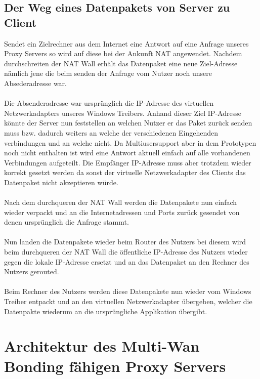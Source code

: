 \subsection{Der Weg eines Datenpakets von Server zu Client}
Sendet ein Zielrechner aus dem Internet eine Antwort auf eine Anfrage unseres Proxy Servers so wird auf diese bei der Ankunft NAT angewendet. Nachdem durchschreiten der NAT Wall erhält das Datenpaket eine neue Ziel-Adresse nämlich jene die beim senden der Anfrage vom Nutzer noch unsere Absederadresse war.
\\\\
Die Absenderadresse war ursprünglich die IP-Adresse des virtuellen Netzwerkadapters unseres Windows Treibers. Anhand dieser Ziel IP-Adresse könnte der Server nun feststellen an welchen Nutzer er das Paket zurück senden muss bzw. dadurch weiters an welche der verschiedenen Eingehenden verbindungen und an welche nicht. Da Multiusersupport aber in dem Prototypen noch nicht enthalten ist wird eine Antwort aktuell einfach auf alle vorhandenen Verbindungen aufgeteilt. Die Empfänger IP-Adresse muss aber trotzdem wieder korrekt gesetzt werden da sonst der virtuelle Netzwerkadapter des Clients das Datenpaket nicht akzeptieren würde.
\\\\
Nach dem durchqueren der NAT Wall werden die Datenpakete nun einfach wieder verpackt und an die Internetadressen und Ports zurück gesendet von denen ursprünglich die Anfrage stammt.
\\\\
Nun landen die Datenpakete wieder beim Router des Nutzers bei diesem wird beim durchqueren der NAT Wall die öffentliche IP-Adresse des Nutzers wieder gegen die lokale IP-Adresse ersetzt und an das Datenpaket an den Rechner des Nutzers gerouted.
\\\\ 
Beim Rechner des Nutzers werden diese Datenpakete nun wieder vom Windows Treiber entpackt und an den virtuellen Netzwerkadapter übergeben, welcher die Datenpakte wiederum an die ursprüngliche Applikation übergibt.


\section{Architektur des Multi-Wan Bonding fähigen Proxy Servers}
